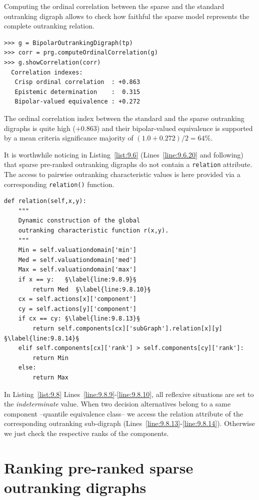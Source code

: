 Computing the ordinal correlation between the sparse and the standard outranking digraph allows to check how faithful the sparse model represents the complete outranking relation.
\begin{lstlisting}
>>> g = BipolarOutrankingDigraph(tp)
>>> corr = prg.computeOrdinalCorrelation(g)
>>> g.showCorrelation(corr)
  Correlation indexes:
   Crisp ordinal correlation  : +0.863
   Epistemic determination    :  0.315
   Bipolar-valued equivalence : +0.272
\end{lstlisting}   

The ordinal correlation index between the standard and the sparse outranking digraphs is quite high ($+0.863$) and their bipolar-valued equivalence is supported by a mean criteria significance majority of $(1.0+0.272)/2 = 64\%$.

It is worthwhile noticing in Listing~\vref{list:9.6} (Lines~\ref{line:9.6.20} and following) that sparse pre-ranked outranking digraphs do not contain a \texttt{relation} attribute. The access to pairwise outranking characteristic values is here provided via a corresponding \texttt{relation()} function.
\begin{lstlisting}[caption={Functional binary relation characteristics},label=list:9.8]
def relation(self,x,y):
    """
    Dynamic construction of the global
    outranking characteristic function r(x,y).
    """
    Min = self.valuationdomain['min']
    Med = self.valuationdomain['med']
    Max = self.valuationdomain['max']
    if x == y:   §\label{line:9.8.9}§
        return Med  §\label{line:9.8.10}§
    cx = self.actions[x]['component']
    cy = self.actions[y]['component']
    if cx == cy: §\label{line:9.8.13}§
        return self.components[cx]['subGraph'].relation[x][y] §\label{line:9.8.14}§
    elif self.components[cx]['rank'] > self.components[cy]['rank']:
        return Min
    else:
        return Max
\end{lstlisting}

In Listing~\vref{list:9.8} Lines~\ref{line:9.8.9}-\ref{line:9.8.10}, all reflexive situations are set to the \emph{indeterminate} value. When two decision alternatives belong to a same component --quantile equivalence class-- we access the relation attribute of the corresponding outranking sub-digraph (Lines~\ref{line:9.8.13}-\ref{line:9.8.14}). Otherwise we just check the respective ranks of the components.

\section{Ranking pre-ranked sparse outranking digraphs}
\label{sec:9.4}

